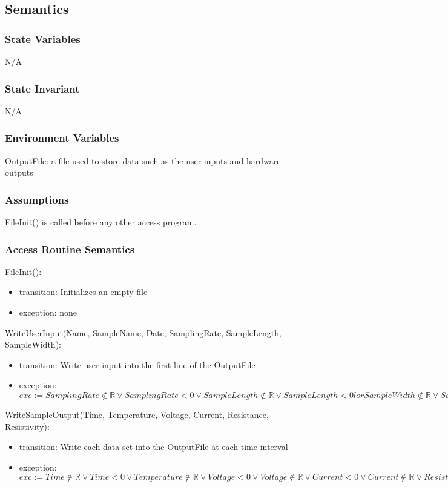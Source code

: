 \documentclass[12pt, titlepage]{article}
\begin{document}
\subsection{Semantics}

\subsubsection{State Variables}

N/A
\subsubsection{State Invariant}

N/A
\subsubsection{Environment Variables}

OutputFile: a file used to store data such as the user inputs and hardware outputs

\subsubsection{Assumptions}

FileInit() is called before any other access program. 

\subsubsection{Access Routine Semantics}

\noindent FileInit():
\begin{itemize}
\item transition: Initializes an empty file
\item exception: none
\end{itemize}

\noindent WriteUserInput(Name, SampleName, Date, SamplingRate, SampleLength, SampleWidth):
\begin{itemize}
\item transition: Write user input into the first line of the OutputFile 
\item exception: $exc:= SamplingRate \notin \mathbb{R} \lor SamplingRate < 0 \lor SampleLength \notin \mathbb{R} \lor SampleLength < 0 lor SampleWidth \notin \mathbb{R} \lor SampleWidth < 0 \Rightarrow INVALID$
\end{itemize}

\noindent WriteSampleOutput(Time, Temperature, Voltage, Current, Resistance, Resistivity):
\begin{itemize}
\item transition: Write each data set into the OutputFile at each time interval
\item exception: $exc:= Time \notin  \mathbb{R} \lor Time < 0 \lor  Temperature \notin  \mathbb{R} \lor Voltage < 0 \lor  Voltage \notin  \mathbb{R} \lor Current < 0 \lor  Current \notin  \mathbb{R} \lor Resistance < 0 \lor  Resistance \notin  \mathbb{R} \lor Resistivity < 0\lor  Resistance \notin  \mathbb{R} \lor Resistivity < 0\Rightarrow INVALID$
\end{itemize}
\end{document}
